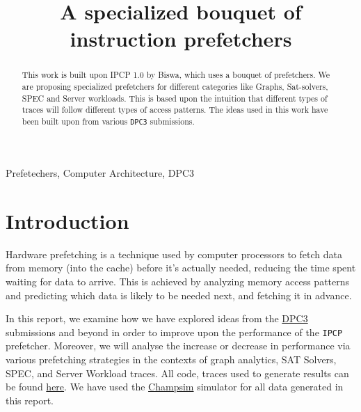 \documentclass[conference]{IEEEtran}
\begin{document}
\title{A specialized bouquet of instruction prefetchers}


\author{
}

\maketitle

\begin{abstract}
This work is built upon IPCP 1.0 by Biswa, which uses a bouquet of prefetchers. We are proposing specialized prefetchers for different categories like Graphs, Sat-solvers, SPEC and Server workloads. This is based upon the intuition that different types of traces will follow different types of access patterns. The ideas used in this work have been built upon from various \verb|DPC3| submissions\cite{b1}\cite{b2}\cite{b3}. %
\end{abstract}

\begin{IEEEkeywords}
Prefetechers, Computer Architecture, DPC3 
\end{IEEEkeywords}

\section{Introduction}
Hardware prefetching is a technique used by computer processors to fetch data from memory (into the cache) before it's actually needed, reducing the time spent waiting for data to arrive. This is achieved by analyzing memory access patterns and predicting which data is likely to be needed next, and fetching it in advance. 

In this report, we examine how we have explored ideas from the \href{https://dpc3.compas.cs.stonybrook.edu/?final_programs}{DPC3} submissions and beyond in order to improve upon the performance of the \verb|IPCP| prefetcher. Moreover, we will analyse the increase or decrease in performance via various prefetching strategies in the contexts of graph analytics, SAT Solvers, SPEC, and Server Workload traces. All code, traces used to generate results can be found \href{https://github.com/ChopstickAyush/Riscy\_Data\_Prefetching}{here}. We have used the \href{https://github.com/ChampSim/ChampSim}{Champsim} simulator for all data generated in this report.
\end{document}
